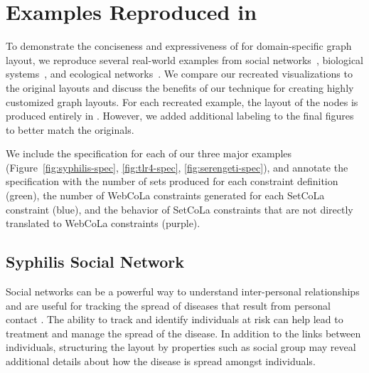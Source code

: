\section{Examples Reproduced in \projectname}
\label{sec:examples}

To demonstrate the conciseness and expressiveness of \projectname for domain-specific
graph layout, we reproduce several real-world examples from social 
networks~\cite{rothenberg1998using}, biological systems~\cite{barsky2008cerebral}, 
and ecological networks~\cite{kruger2017,baskerville2011spatial}. 
We compare our recreated visualizations to the original layouts and 
discuss the benefits of our technique for creating highly customized graph layouts.
For each recreated example, the layout of the nodes is produced
entirely in \projectname. However, we added additional labeling to the 
final figures to better match the originals.

We include the specification for each of our three major examples 
(Figure~\ref{fig:syphilis-spec}, \ref{fig:tlr4-spec}, \ref{fig:serengeti-spec}),
and annotate the specification with the number of sets produced for each 
constraint definition (green), the number of WebCoLa constraints generated
for each SetCoLa constraint (blue), and the behavior of SetCoLa constraints
that are not directly translated to WebCoLa constraints (purple).


\subsection{Syphilis Social Network}
\syphilisLayout
\syphilisSpec

Social networks can be a powerful way to understand inter-personal
relationships and are useful for tracking the spread of diseases that
result from personal contact \cite{rothenberg1998using,fitzpatrick2001preventable,mcelroy2003network,fu2011hiv}.
The ability to track and identify individuals at risk can help
lead to treatment and manage the spread of the disease. In
addition to the links between individuals, structuring the layout by
properties such as social group may reveal additional details about
how the disease is spread amongst individuals.

